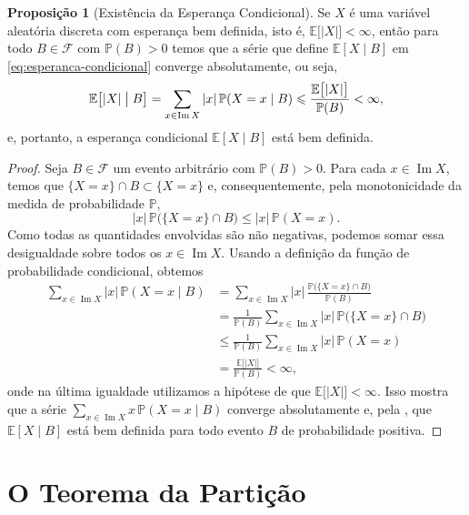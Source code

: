 \documentclass[12pt,portuguese]{article}
\theoremstyle{definition}
\newtheorem{proposition}[proposition]{Proposição}
\begin{document}
\begin{proposition}[Existência da Esperança Condicional]\label{prop:existencia-esperanca-condicional}
Se \(X\) é uma variável aleatória discreta com esperança bem definida, isto
é, \(\mathbb{E}\bigl[|X|\bigr] < \infty\), então para todo \(B \in \mathcal{F}\)
com \(\mathbb{P}(B) > 0\) temos que a série que define \(\mathbb{E}[X \mid B]\)
em \eqref{eq:esperanca-condicional} converge absolutamente, ou seja,
\[
\mathbb{E}\bigl[|X| \bigm| B\bigr]
= \sum_{x \in \operatorname{Im} X} |x| \, \mathbb{P}(X = x \mid B)
\leqslant \frac{\mathbb{E}\bigl[|X|\bigr]}{\mathbb{P}(B)} < \infty,
\]
e, portanto, a esperança condicional \(\mathbb{E}[X \mid B]\) está bem
definida.
\end{proposition}

\begin{proof}
Seja \(B \in \mathcal{F}\) um evento arbitrário com \(\mathbb{P}(B) > 0\).
Para cada \(x \in \operatorname{Im} X\), temos que
\(\{X = x\} \cap B \subset \{X = x\}\) e, consequentemente, pela
monotonicidade da medida de probabilidade \(\mathbb{P}\),
\[
|x| \, \mathbb{P}\bigl(\{X = x\} \cap B\bigr) \leqslant |x| \, \mathbb{P}(X = x).
\]
Como todas as quantidades envolvidas são não negativas, podemos somar essa
desigualdade sobre todos os \(x \in \operatorname{Im} X\). Usando a definição
da função de probabilidade condicional, obtemos
\[
\begin{aligned}
\sum_{x \in \operatorname{Im} X} |x| \, \mathbb{P}(X = x \mid B)
&=
\sum_{x \in \operatorname{Im} X}
|x| \, \frac{\mathbb{P}\bigl(\{X = x\} \cap B\bigr)}{\mathbb{P}(B)}
\\[0.3cm]
&=
\frac{1}{\mathbb{P}(B)}
\sum_{x \in \operatorname{Im} X}
|x| \, \mathbb{P}\bigl(\{X = x\} \cap B\bigr)
\\[0.3cm]
&\leqslant
\frac{1}{\mathbb{P}(B)}
\sum_{x \in \operatorname{Im} X}
|x| \, \mathbb{P}(X = x)
\\[0.3cm]
&=
\frac{\mathbb{E}\bigl[|X|\bigr]}{\mathbb{P}(B)}
< \infty,
\end{aligned}
\]
onde na última igualdade utilizamos a hipótese de que
\(\mathbb{E}\bigl[|X|\bigr] < \infty\).
Isso mostra que a série
\(\sum_{x \in \operatorname{Im} X} x \, \mathbb{P}(X = x \mid B)\)
converge absolutamente e, pela , que
\(\mathbb{E}[X \mid B]\) está bem definida para todo evento \(B\) de
probabilidade positiva.
\end{proof}


\section{O Teorema da Partição}
\label{sec:teorema-da-particao}
\end{document}
